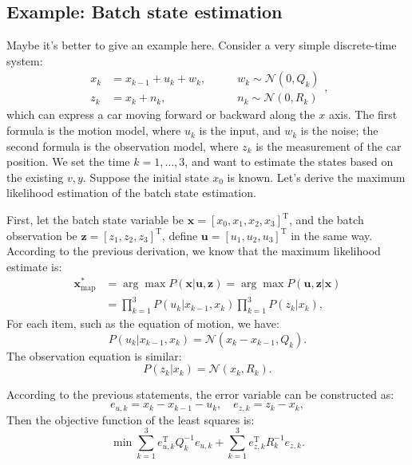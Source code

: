 \subsection{Example: Batch state estimation}
Maybe it's better to give an example here. Consider a very simple discrete-time system:
\begin{equation}
    \begin{array}{lll}
        {x_k} &= {x_{k-1}} + {u_k} + {w_k},&\qquad w_k \sim \mathcal{N}\left( {0,Q_k} \right)\\
        {z_k} &= {x_k} + {n_k},&\qquad {n_k}\sim \mathcal{N}\left( {0,R_k} \right)
    \end{array},
\end{equation}
which can express a car moving forward or backward along the $x$ axis. The first formula is the motion model, where $u_k$ is the input, and $w_k$ is the noise; the second formula is the observation model, where $z_k$ is the measurement of the car position. We set the time $k=1,\ldots,3$, and want to estimate the states based on the existing $v,y$. Suppose the initial state $x_0$ is known. Let's derive the maximum likelihood estimation of the batch state estimation.

First, let the batch state variable be $\bm{x} = [x_0,x_1, x_2, x_3]^\mathrm{T}$, and the batch observation be $\bm{z} = [z_1,z_2,z_3]^ \mathrm{T}$, define $\bm{u}=[u_1,u_2,u_3]^\mathrm{T}$ in the same way. According to the previous derivation, we know that the maximum likelihood estimate is:
\begin{equation}
    \begin{aligned}
        {\bm{x}_{\mathrm{map}}^*} &= \arg \max P(\bm{x}|\bm{u},\bm{z}) = \arg \max P( \bm{u},\bm{z}|\bm{x})\\
        &= \prod\limits_{k = 1}^3 {P({u_k}|{x_{k-1}},{x_k})\prod\limits_{k = 1}^3 {P\left( { {z_k}|{x_k}} \right)} },
    \end{aligned}
\end{equation}
For each item, such as the equation of motion, we have:
\begin{equation}
    P({u_k}|{x_{k-1}},{x_k}) = \mathcal{N}({x_k}-{x_{k-1}},{Q_k}).
\end{equation}
The observation equation is similar:
\begin{equation}
    P\left( {{z_k}|{x_k}} \right) = \mathcal{N}\left( {{x_k},{R_k}} \right).
\end{equation}

According to the previous statements, the error variable can be constructed as:
\begin{equation}
    {e_{u,k}} = {x_k}-{x_{k-1}}-{u_k}, \quad {e_{z,k}} = {z_k}-{x_k},
\end{equation}
Then the objective function of the least squares is:
\begin{equation}
    \min \sum\limits_{k = 1}^3 {e_{u,k}^\mathrm{T} Q_k^{-1}{e_{u,k}}} + \sum\limits_{k = 1 }^3 {e_{z,k}^\mathrm{T}{R^{-1}_k}{e_{z,k}}}.
\end{equation}

